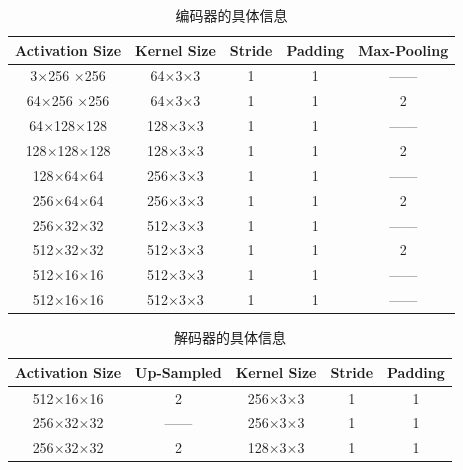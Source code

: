 \begin{multicols}{2}
\begin{table}[H]
	\scriptsize
	\renewcommand{\arraystretch}{1.0}
	\centering
	\caption{\centering 编码器的具体信息}\label{tb:9}
	\begin{tabular}{ccccc}
		\toprule[1.5pt]	Activation Size & Kernel Size & Stride & Padding & Max-Pooling \\
		\midrule[1pt]
		3$\times$256 $\times$256   & 64$\times$3$\times$3  & 1      & 1       & ——          \\
		64$\times$256 $\times$256      & 64$\times$3$\times$3   & 1      & 1       & 2           \\
		64$\times$128$\times$128      & 128$\times$3$\times$3 & 1      & 1       &  ——         \\
		128$\times$128$\times$128     & 128$\times$3$\times$3 & 1      & 1       & 2           \\
		128$\times$64$\times$64       & 256$\times$3$\times$3 & 1      & 1       & ——           \\
		256$\times$64$\times$64   & 256$\times$3$\times$3 & 1      & 1       & 2           \\
		256$\times$32$\times$32   & 512$\times$3$\times$3 & 1      & 1       &  ——           \\
		512$\times$32$\times$32   & 512$\times$3$\times$3 & 1      & 1       & 2           \\
		512$\times$16$\times$16    & 512$\times$3$\times$3  & 1      & 1       &  ——           \\
		512$\times$16$\times$16       & 512$\times$3$\times$3 & 1      & 1       &  ——      \\    
		\bottomrule[1.5pt]
	\end{tabular}
\end{table}
\begin{table}[H]
	\scriptsize
	\renewcommand{\arraystretch}{1.0}
	\centering
	\caption{\centering 解码器的具体信息}\label{tb:10}
	\begin{tabular}{ccccc}
		\toprule[1.5pt]	Activation Size & Up-Sampled & Kernel Size & Stride & Padding \\
		\midrule[1pt]
		512$\times$16$\times$16       & 2          & 256$\times$3$\times$3 & 1      & 1       \\
		256$\times$32$\times$32   & ——           & 256$\times$3$\times$3 & 1      & 1       \\
		256$\times$32$\times$32   & 2          & 128$\times$3$\times$3 & 1      & 1       \\

\end{tabular}
\end{table}
\end{multicols}
